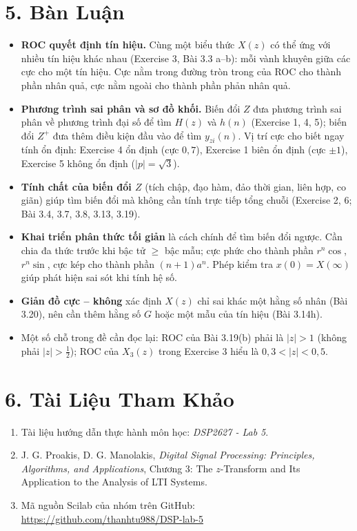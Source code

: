 \documentclass[12pt,a4paper]{article}
\begin{document}
\section*{5. Bàn Luận}
\begin{itemize}
    \item \textbf{ROC quyết định tín hiệu.} Cùng một biểu thức $X(z)$ có thể ứng với nhiều tín hiệu khác nhau (Exercise 3, Bài 3.3 a--b): mỗi vành khuyên giữa các cực cho một tín hiệu. Cực nằm trong đường tròn trong của ROC cho thành phần nhân quả, cực nằm ngoài cho thành phần phản nhân quả.
    \item \textbf{Phương trình sai phân và sơ đồ khối.} Biến đổi $Z$ đưa phương trình sai phân về phương trình đại số để tìm $H(z)$ và $h(n)$ (Exercise 1, 4, 5); biến đổi $Z^{+}$ đưa thêm điều kiện đầu vào để tìm $y_{zi}(n)$. Vị trí cực cho biết ngay tính ổn định: Exercise 4 ổn định (cực $0{,}7$), Exercise 1 biên ổn định (cực $\pm1$), Exercise 5 không ổn định ($|p|=\sqrt3$).
    \item \textbf{Tính chất của biến đổi $Z$} (tích chập, đạo hàm, đảo thời gian, liên hợp, co giãn) giúp tìm biến đổi mà không cần tính trực tiếp tổng chuỗi (Exercise 2, 6; Bài 3.4, 3.7, 3.8, 3.13, 3.19).
    \item \textbf{Khai triển phân thức tối giản} là cách chính để tìm biến đổi ngược. Cần chia đa thức trước khi bậc tử $\ge$ bậc mẫu; cực phức cho thành phần $r^n\cos$, $r^n\sin$, cực kép cho thành phần $(n+1)a^n$. Phép kiểm tra $x(0)=X(\infty)$ giúp phát hiện sai sót khi tính hệ số.
    \item \textbf{Giản đồ cực -- không} xác định $X(z)$ chỉ sai khác một hằng số nhân (Bài 3.20), nên cần thêm hằng số $G$ hoặc một mẫu của tín hiệu (Bài 3.14h).
    \item Một số chỗ trong đề cần đọc lại: ROC của Bài 3.19(b) phải là $|z|>1$ (không phải $|z|>\tfrac12$); ROC của $X_3(z)$ trong Exercise 3 hiểu là $0{,}3<|z|<0{,}5$.
\end{itemize}

\section*{6. Tài Liệu Tham Khảo}
\begin{enumerate}
    \item Tài liệu hướng dẫn thực hành môn học: \textit{DSP2627 - Lab 5}.
    \item J. G. Proakis, D. G. Manolakis, \textit{Digital Signal Processing: Principles, Algorithms, and Applications}, Chương 3: The $z$-Transform and Its Application to the Analysis of LTI Systems.
    \item Mã nguồn Scilab của nhóm trên GitHub:\\ \url{https://github.com/thanhtu988/DSP-lab-5}
\end{enumerate}
\end{document}
